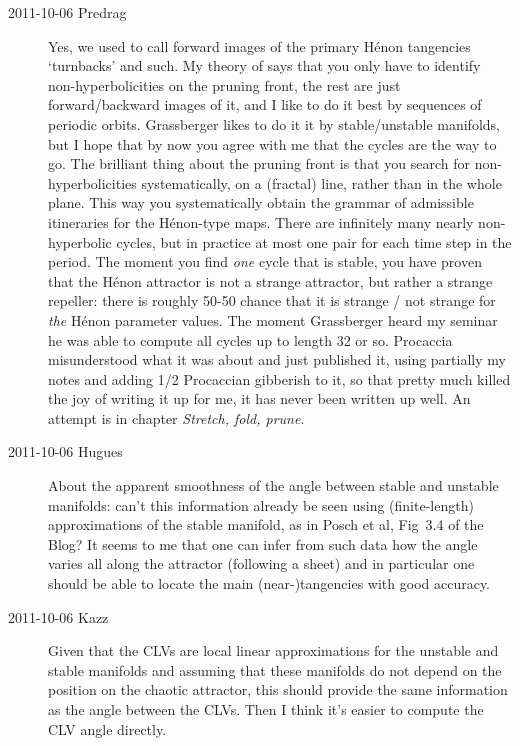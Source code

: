 \begin{description}
\item[2011-10-06 Predrag]
Yes, we used to call forward images of the primary H\'enon tangencies
`turnbacks' and such. My theory of
 says that you only have to identify non-hyperbolicities on the
pruning front, the rest are just forward/backward images of it, and I
like to do it best by sequences of periodic orbits. Grassberger likes to
do it it by stable/unstable manifolds, but I hope that by now you agree
with me that the cycles are the way to go. The brilliant thing about the
pruning front is that you search for non-hyperbolicities systematically,
on a (fractal) line, rather than in the whole plane. This way you
systematically obtain the grammar of admissible itineraries for the
H\'enon-type maps. There are infinitely many nearly non-hyperbolic
cycles, but in practice at most one pair for each time step in the
period. The moment you find \emph{one} cycle that is stable, you have
proven that the H\'enon attractor is not a strange attractor, but rather
a strange repeller: there is roughly 50-50 chance that it is strange /
not strange for \emph{the} H\'enon parameter values. The moment
Grassberger heard my seminar he was able to compute all cycles up to
length 32 or so. Procaccia misunderstood what it was about and just
published it, using partially my notes and adding 1/2
Procaccian gibberish to it, so that pretty much killed the joy of writing
it up for me, it has never been written up well. An attempt is in
 chapter
{\em Stretch, fold, prune}.

\item[2011-10-06 Hugues]
About the apparent smoothness of the angle between stable and unstable
manifolds: can't this information already be seen using (finite-length)
approximations of the stable manifold, as in Posch et al, Fig~3.4 of the
Blog? It seems to me that one can infer from such data how the angle
varies all along the attractor (following a sheet) and in particular one
should be able to locate the main (near-)tangencies with good accuracy.

\item[2011-10-06 Kazz]
Given that the CLVs are local linear approximations for the unstable and
stable manifolds and assuming that these manifolds do not depend on the
position on the chaotic attractor, this should provide the same
information as the angle between the CLVs. Then I think it's easier to
compute the CLV angle directly.


\end{description}
